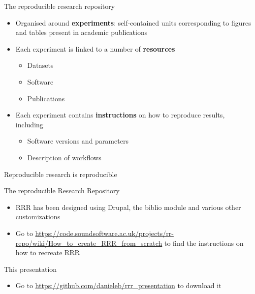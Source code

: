 \documentclass[10pt]{beamer}
\begin{document}
\begin{frame}{The reproducible research repository}
\begin{block}{}
\begin{itemize}
\item Organised around \textbf{experiments}: self-contained units corresponding to figures and tables present in academic publications
\item Each experiment is linked to a number of \textbf{resources} 
\begin{itemize}
\item Datasets
\item Software
\item Publications
\end{itemize}
\item Each experiment contains \textbf{instructions} on how to reproduce results, including
\begin{itemize}
\item Software versions and parameters
\item Description of workflows
\end{itemize}
\end{itemize}
\end{block}
\end{frame}

\begin{frame}{Reproducible research is reproducible}
\begin{block}{The reproducible Research Repository}
\begin{itemize}
\item RRR has been designed using Drupal, the biblio module and various other customizations
\item Go to \url{https://code.soundsoftware.ac.uk/projects/rr-repo/wiki/How_to_create_RRR_from_scratch} to find the instructions on how to recreate RRR
\end{itemize}
\end{block}
\begin{block}{This presentation}
\begin{itemize}
\item Go to \url{https://github.com/danieleb/rrr_presentation} to download it
\end{itemize}
\end{block}
\end{frame}
\end{document}
